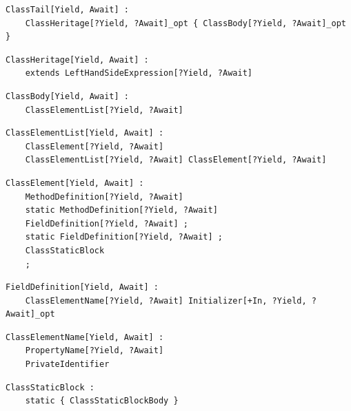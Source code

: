 \noindent\textbf{\texttt{}}\par
\begin{lstlisting}
ClassTail[Yield, Await] :
    ClassHeritage[?Yield, ?Await]_opt { ClassBody[?Yield, ?Await]_opt }
\end{lstlisting}

\noindent\textbf{\texttt{}}\par
\begin{lstlisting}
ClassHeritage[Yield, Await] :
    extends LeftHandSideExpression[?Yield, ?Await]
\end{lstlisting}

\noindent\textbf{\texttt{}}\par
\begin{lstlisting}
ClassBody[Yield, Await] :
    ClassElementList[?Yield, ?Await]
\end{lstlisting}

\noindent\textbf{\texttt{}}\par
\begin{lstlisting}
ClassElementList[Yield, Await] :
    ClassElement[?Yield, ?Await]
    ClassElementList[?Yield, ?Await] ClassElement[?Yield, ?Await]
\end{lstlisting}

\noindent\textbf{\texttt{}}\par
\begin{lstlisting}
ClassElement[Yield, Await] :
    MethodDefinition[?Yield, ?Await]
    static MethodDefinition[?Yield, ?Await]
    FieldDefinition[?Yield, ?Await] ;
    static FieldDefinition[?Yield, ?Await] ;
    ClassStaticBlock
    ;
\end{lstlisting}

\noindent\textbf{\texttt{}}\par
\begin{lstlisting}
FieldDefinition[Yield, Await] :
    ClassElementName[?Yield, ?Await] Initializer[+In, ?Yield, ?Await]_opt
\end{lstlisting}

\noindent\textbf{\texttt{}}\par
\begin{lstlisting}
ClassElementName[Yield, Await] :
    PropertyName[?Yield, ?Await]
    PrivateIdentifier
\end{lstlisting}

\noindent\textbf{\texttt{}}\par
\begin{lstlisting}
ClassStaticBlock :
    static { ClassStaticBlockBody }
\end{lstlisting}

